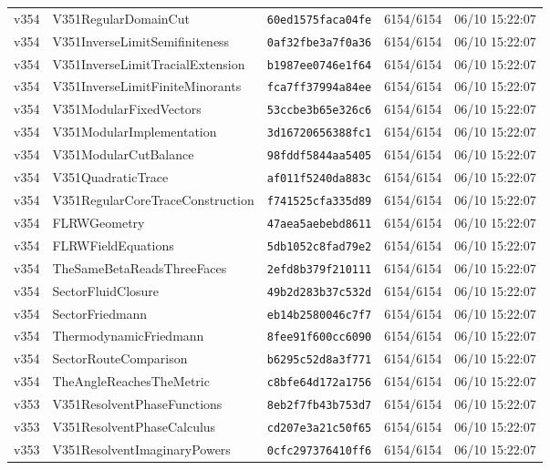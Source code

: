 \documentclass[11pt]{article}
\theoremstyle{definition}\newtheorem{deriv}{Derivation}
\begin{document}
{\begin{longtable}{@{}lllll@{}}
v354 & V351RegularDomainCut & \texttt{60ed1575faca04fe} & 6154/6154 & 06/10 15:22:07 \\
v354 & V351InverseLimitSemifiniteness & \texttt{0af32fbe3a7f0a36} & 6154/6154 & 06/10 15:22:07 \\
v354 & V351InverseLimitTracialExtension & \texttt{b1987ee0746e1f64} & 6154/6154 & 06/10 15:22:07 \\
v354 & V351InverseLimitFiniteMinorants & \texttt{fca7ff37994a84ee} & 6154/6154 & 06/10 15:22:07 \\
v354 & V351ModularFixedVectors & \texttt{53ccbe3b65e326c6} & 6154/6154 & 06/10 15:22:07 \\
v354 & V351ModularImplementation & \texttt{3d16720656388fc1} & 6154/6154 & 06/10 15:22:07 \\
v354 & V351ModularCutBalance & \texttt{98fddf5844aa5405} & 6154/6154 & 06/10 15:22:07 \\
v354 & V351QuadraticTrace & \texttt{af011f5240da883c} & 6154/6154 & 06/10 15:22:07 \\
v354 & V351RegularCoreTraceConstruction & \texttt{f741525cfa335d89} & 6154/6154 & 06/10 15:22:07 \\
v354 & FLRWGeometry & \texttt{47aea5aebebd8611} & 6154/6154 & 06/10 15:22:07 \\
v354 & FLRWFieldEquations & \texttt{5db1052c8fad79e2} & 6154/6154 & 06/10 15:22:07 \\
v354 & TheSameBetaReadsThreeFaces & \texttt{2efd8b379f210111} & 6154/6154 & 06/10 15:22:07 \\
v354 & SectorFluidClosure & \texttt{49b2d283b37c532d} & 6154/6154 & 06/10 15:22:07 \\
v354 & SectorFriedmann & \texttt{eb14b2580046c7f7} & 6154/6154 & 06/10 15:22:07 \\
v354 & ThermodynamicFriedmann & \texttt{8fee91f600cc6090} & 6154/6154 & 06/10 15:22:07 \\
v354 & SectorRouteComparison & \texttt{b6295c52d8a3f771} & 6154/6154 & 06/10 15:22:07 \\
v354 & TheAngleReachesTheMetric & \texttt{c8bfe64d172a1756} & 6154/6154 & 06/10 15:22:07 \\
v353 & V351ResolventPhaseFunctions & \texttt{8eb2f7fb43b753d7} & 6154/6154 & 06/10 15:22:07 \\
v353 & V351ResolventPhaseCalculus & \texttt{cd207e3a21c50f65} & 6154/6154 & 06/10 15:22:07 \\
v353 & V351ResolventImaginaryPowers & \texttt{0cfc297376410ff6} & 6154/6154 & 06/10 15:22:07 \\

\end{longtable}}
\end{document}
